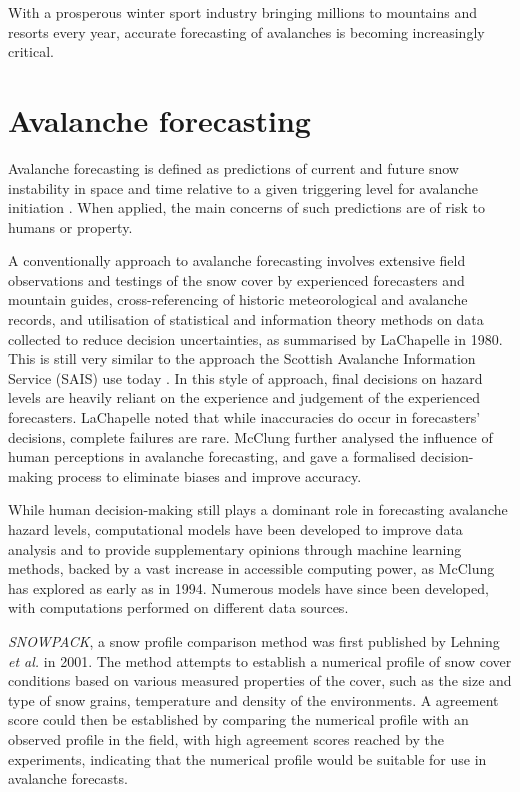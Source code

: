 \documentclass[openany]{UoYCSproject}
\begin{document}
With a prosperous winter sport industry bringing millions to mountains and resorts every year\cite{hudson2003sport}, accurate forecasting of avalanches is becoming increasingly critical. 

\section{Avalanche forecasting}

Avalanche forecasting is defined as predictions of current and future snow instability in space and time relative to a given triggering level for avalanche initiation \cite[p. 131]{McClung2002}. When applied, the main concerns of such predictions are of risk to humans or property. 

A conventionally approach to avalanche forecasting involves extensive field observations and testings of the snow cover by experienced forecasters and mountain guides, cross-referencing of historic meteorological and avalanche records, and utilisation of statistical and information theory methods on data collected to reduce decision uncertainties, as summarised by LaChapelle \cite{lachapelle1980fundamental} in 1980. This is still very similar to the approach the Scottish Avalanche Information Service (SAIS) use today \cite[p. 5]{sais2014-15}. In this style of approach, final decisions on hazard levels are heavily reliant on the experience and judgement of the experienced forecasters. LaChapelle noted \cite[p. 76]{lachapelle1980fundamental} that while inaccuracies do occur in forecasters' decisions, complete failures are rare. McClung \cite{mcclung2006avalanche} further analysed the influence of human perceptions in avalanche forecasting, and gave a formalised decision-making process to eliminate biases and improve accuracy.

While human decision-making still plays a dominant role in forecasting avalanche hazard levels, computational models have been developed to improve data analysis and to provide supplementary opinions through machine learning methods, backed by a vast increase in accessible computing power, as McClung \cite{McClung1994} has explored as early as in 1994. Numerous models have since been developed, with computations performed on different data sources. 

\textit{SNOWPACK}, a snow profile comparison method was first published by Lehning \textit{et al.} \cite{Lehning2001253} in 2001. The method attempts to establish a numerical profile of snow cover conditions based on various measured properties of the cover, such as the size and type of snow grains, temperature and density of the environments. A agreement score could then be established by comparing the numerical profile with an observed profile in the field, with high agreement scores reached by the experiments, indicating that the numerical profile would be suitable for use in avalanche forecasts. 
\end{document}
